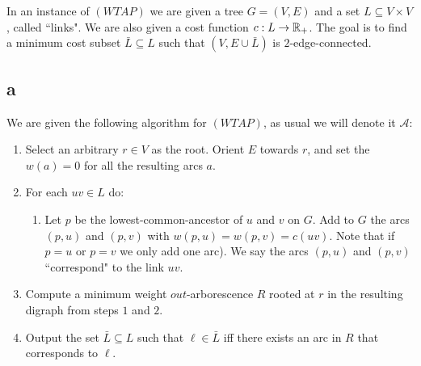 \documentclass[letterpaper,12pt,oneside,onecolumn]{article}
\newcommand{\cA}{\mathcal{A}} \newcommand{\cB}{\mathcal{B}}
\begin{document}
\section{}
\paragraph{}
In an instance of $(WTAP)$ we are given a tree $G=(V,E)$ and a set $L \subseteq V\times V$, called ``links". We are also given a cost function $c: L \rightarrow \mathbb{R}_+$. The goal is to find a minimum cost subset $\bar{L} \subseteq L$ such that $(V, E \cup \bar{L})$ is $2$-edge-connected.
\subsection{a}
We are given the following algorithm for $(WTAP)$, as usual we will denote it $\cA$:
\begin{enumerate}
\item Select an arbitrary $r \in V$ as the root. Orient $E$ towards $r$, and set the $w(a) = 0$ for all the resulting arcs $a$.
\item For each $uv \in L$ do:
	\begin{enumerate}
	\item Let $p$ be the lowest-common-ancestor of $u$ and $v$ on $G$. Add to $G$ the arcs $(p,u)$ and $(p,v)$ with $w(p,u) = w(p,v) = c(uv)$. Note that if $p=u$ or $p=v$ we only add one arc). We say the arcs $(p,u)$ and $(p,v)$ ``correspond" to the link $uv$.
	\end{enumerate}
\item Compute a minimum weight $out$-arborescence $R$ rooted at $r$ in the resulting digraph from steps $1$ and $2$.
\item Output the set $\bar{L} \subseteq L$ such that $\ell \in \bar{L}$ iff there exists an arc in $R$ that corresponds to $\ell$.
\end{enumerate}
\end{document}
